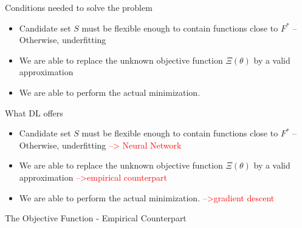 \documentclass[aspectratio=169]{beamer} %
\begin{document}
\begin{frame}{Conditions needed to solve the problem }
\begin{itemize}
    \item Candidate set $S$ must be flexible enough to contain functions close to $F^*$ -- Otherwise, underfitting
    \item We are able to replace the unknown objective function $\Xi(\theta)$ by a valid approximation 
    \item We are able to perform the actual minimization.
\end{itemize}
    
\end{frame}

\begin{frame}{What DL offers}

\begin{itemize}
    \item Candidate set $S$ must be flexible enough to contain functions close to $F^*$ -- Otherwise, underfitting \textcolor{red}{--> Neural Network}
    \item We are able to replace the unknown objective function $\Xi(\theta)$ by a valid approximation \textcolor{red}{-->empirical counterpart}
    \item We are able to perform the actual minimization. \textcolor{red}{-->gradient descent}
\end{itemize}
    
\end{frame}

\begin{frame}{The Objective Function - Empirical Counterpart}
    
\end{frame}
\end{document}
